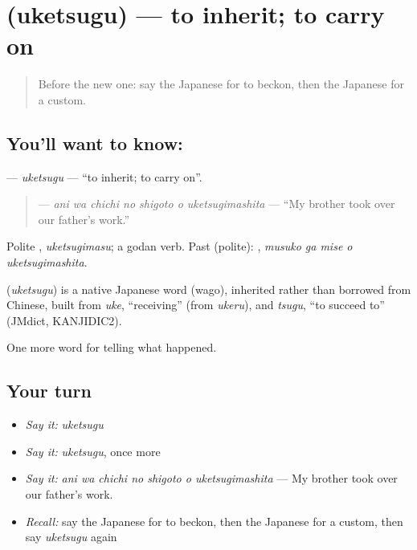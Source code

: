 \section[\texorpdfstring{\ja{うけつぐ} (uketsugu)}{うけつぐ (uketsugu)}]{ (uketsugu) — to inherit; to carry on}

\label{lesson:JA-C296-uketsugu}



\begin{quote}
Before the new one: say the Japanese for to beckon, then the Japanese for a custom.
\end{quote}

\subsection*{You'll want to know: }
\textbf{} — \emph{uketsugu} — \textquotedblleft{}to inherit; to carry on\textquotedblright{}.

\begin{quote}
\textbf{   } — \emph{ani wa chichi no shigoto o uketsugimashita} — \textquotedblleft{}My brother took over our father's work.\textquotedblright{}
\end{quote}

Polite \textbf{}, \emph{uketsugimasu}; a godan verb. Past (polite): \textbf{  }, \emph{musuko ga mise o uketsugimashita}.

\begin{cousinweb}
\textbf{} (\emph{uketsugu}) is a native Japanese word (wago), inherited rather than borrowed from Chinese, built from \emph{uke}, \textquotedblleft{}receiving\textquotedblright{} (from \emph{ukeru}), and \emph{tsugu}, \textquotedblleft{}to succeed to\textquotedblright{} (JMdict, KANJIDIC2).
\end{cousinweb}

\begin{grammarlens}[title={What you've built}]
One more word for telling what happened.
\end{grammarlens}

\subsection*{Your turn}
\begin{itemize}
\raggedright
  \item \emph{Say it:} \emph{uketsugu}
  \item \emph{Say it:} \emph{uketsugu}, once more
  \item \emph{Say it:} \emph{ani wa chichi no shigoto o uketsugimashita} — My brother took over our father's work.
  \item \emph{Recall:} say the Japanese for to beckon, then the Japanese for a custom, then say \emph{uketsugu} again
\end{itemize}

